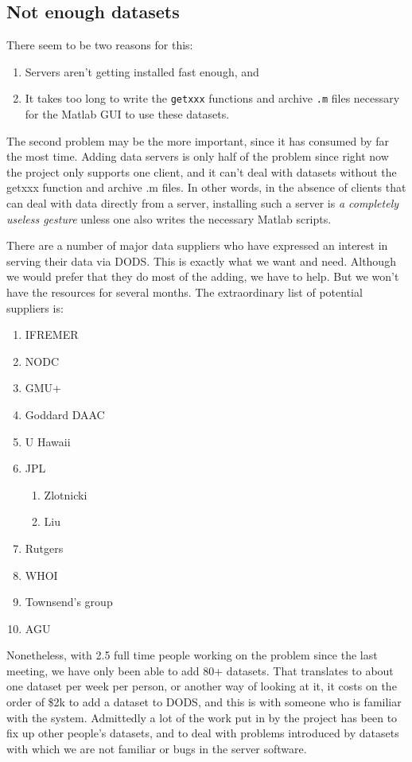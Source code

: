 \documentclass[10pt]{article}
\begin{document}
\subsection{Not enough datasets}

There seem to be two reasons for this:

\begin{enumerate}
\item Servers aren't getting installed fast enough, and 
\item It takes too long to write the \texttt{getxxx} functions and
  archive \texttt{.m} files necessary for the Matlab GUI to use these
  datasets.
\end{enumerate}

The second problem may be the more important, since it has consumed by
far the most time.  Adding data servers is only half of the problem
since right now the project only supports one client, and it can't
deal with datasets without the getxxx function and archive .m files.
In other words, in the absence of clients that can deal with data
directly from a server, installing such a server is \emph{a completely
  useless gesture} unless one also writes the necessary Matlab
scripts.  

There are a number of major data suppliers who have expressed an
interest in serving their data via DODS. This is exactly what we want
and need. Although we would prefer that they do most of the adding, we
have to help. But we won't have the resources for several months. The
extraordinary list of potential suppliers is:

\begin{enumerate}
  \item IFREMER
  \item NODC
  \item GMU+
  \item Goddard DAAC
  \item U Hawaii
  \item JPL
    \begin{enumerate}
      \item Zlotnicki
      \item Liu
    \end{enumerate}
  \item Rutgers
  \item WHOI
  \item Townsend's group
  \item AGU
\end{enumerate}

Nonetheless, with 2.5 full time people working on the problem since
the last meeting, we have only been able to add 80+ datasets.  That
translates to about one dataset per week per person, or another way of
looking at it, it costs on the order of \$2k to add a dataset to DODS,
and this is with someone who is familiar with the system. Admittedly a
lot of the work put in by the project has been to fix up other
people's datasets, and to deal with problems introduced by datasets
with which we are not familiar or bugs in the server software.
\end{document}
